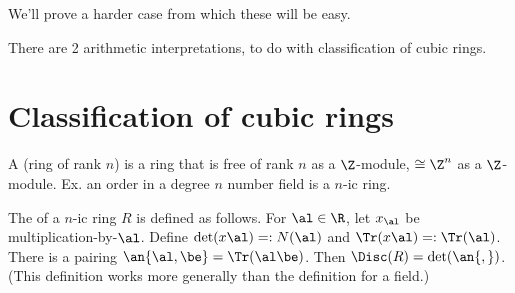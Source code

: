 We'll prove a harder case from which these will be easy.


There are 2 arithmetic interpretations, to do with classification of cubic rings.
\section{Classification of cubic rings}

\begin{df}
A  (ring of rank $n$) is a ring that is free of rank $n$ as a $\Z$-module, $\cong \Z^n$ as a $\Z$-module. Ex. an order in a degree $n$ number field is a $n$-ic ring.

The  of a $n$-ic ring $R$ is defined as follows. For $\al \in \R$, let $x_{\al}$ be multiplication-by-$\al$. Define $\det(x\al)=: N(\al)$ and $\Tr(x\al) =:\Tr(\al)$. 
There is a pairing $\an{\al,\be} = \Tr(\al\be)$. Then $\Disc(R)=\det(\an{,})$. (This definition works more generally than the definition for a field.)
\end{df}

